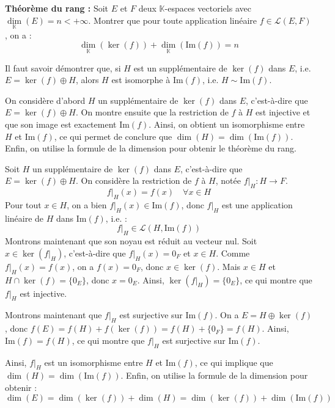 \documentclass[11pt, a4paper]{article}
\theoremstyle{definition}
\begin{document}
\begin{tcolorbox}[instructionstyle]
	\textbf{Théorème du rang :} Soit $E$ et $F$ deux $\mathbb{K}$-espaces vectoriels avec $\underset{\mathbb{K}}{\dim}(E) = n < +\infty$. Montrer que pour toute application linéaire $f \in \mathcal{L}(E, F)$, on a :
	\[\underset{\mathbb{K}}{\dim}(\ker(f)) + \underset{\mathbb{K}}{\dim}(\mathrm{Im}(f)) = n\]
\end{tcolorbox}

\begin{rappel}
	Il faut savoir démontrer que, si $H$ est un supplémentaire de $\ker(f)$ dans $E$, i.e. $E = \ker(f) \oplus H$, alors $H$ est isomorphe à $\mathrm{Im}(f)$, i.e. $H \sim \mathrm{Im}(f)$.
\end{rappel}

\begin{tcolorbox}[methodstyle]
	On considère d'abord $H$ un supplémentaire de $\ker(f)$ dans $E$, c'est-à-dire que $E = \ker(f) \oplus H$. On montre ensuite que la restriction de $f$ à $H$ est injective et que son image est exactement $\mathrm{Im}(f)$. Ainsi, on obtient un isomorphisme entre $H$ et $\mathrm{Im}(f)$, ce qui permet de conclure que $\dim(H) = \dim(\mathrm{Im}(f))$. Enfin, on utilise la formule de la dimension pour obtenir le théorème du rang.
\end{tcolorbox}

Soit $H$ un supplémentaire de $\ker(f)$ dans $E$, c'est-à-dire que $E = \ker(f) \oplus H$. On considère la restriction de $f$ à $H$, notée $f|_H : H \to F$.
$$f|_H(x) = f(x) \quad \forall x \in H$$
Pour tout $x \in H$, on a bien $f|_H(x) \in \mathrm{Im}(f)$, donc $f|_H$ est une application linéaire de $H$ dans $\mathrm{Im}(f)$, i.e. :
$$f|_H \in \mathcal{L}(H, \mathrm{Im}(f))$$
Montrons maintenant que son noyau est réduit au vecteur nul. Soit $x \in \ker(f|_H)$, c'est-à-dire que $f|_H(x) = 0_F$ et $x \in H$. Comme $f|_H(x) = f(x)$, on a $f(x) = 0_F$, donc $x \in \ker(f)$. Mais $x \in H$ et $H \cap \ker(f) = \{0_E\}$, donc $x = 0_E$. Ainsi, $\ker(f|_H) = \{0_E\}$, ce qui montre que $f|_H$ est injective.

Montrons maintenant que $f|_H$ est surjective sur $\mathrm{Im}(f)$. On a $E = H \oplus \ker(f)$, donc $f(E) = f(H) + f(\ker(f)) = f(H) + \{0_F\} = f(H)$. Ainsi, $\mathrm{Im}(f) = f(H)$, ce qui montre que $f|_H$ est surjective sur $\mathrm{Im}(f)$.

Ainsi, $f|_H$ est un isomorphisme entre $H$ et $\mathrm{Im}(f)$, ce qui implique que $\dim(H) = \dim(\mathrm{Im}(f))$. Enfin, on utilise la formule de la dimension pour obtenir :
\[\dim(E) = \dim(\ker(f)) + \dim(H) = \dim(\ker(f)) + \dim(\mathrm{Im}(f))\]
\end{document}
